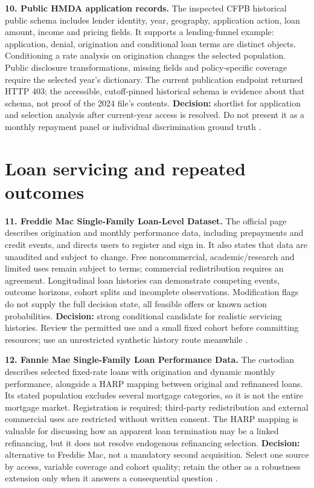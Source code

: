 \textbf{10. Public HMDA application records.} The inspected CFPB
historical public schema includes lender identity, year, geography,
application action, loan amount, income and pricing fields. It supports
a lending-funnel example: application, denial, origination and
conditional loan terms are distinct objects. Conditioning a rate
analysis on origination changes the selected population. Public
disclosure transformations, missing fields and policy-specific coverage
require the selected year's dictionary. The current publication endpoint
returned HTTP 403; the accessible, cutoff-pinned historical schema is
evidence about that schema, not proof of the 2024 file's contents.
\textbf{Decision:} shortlist for application and selection analysis
after current-year access is resolved. Do not present it as a monthly
repayment panel or individual discrimination ground truth
\citep{pd15_hmda_schema}.

\hypertarget{loan-servicing-and-repeated-outcomes}{%
\section{Loan servicing and repeated
outcomes}\label{loan-servicing-and-repeated-outcomes}}

\textbf{11. Freddie Mac Single-Family Loan-Level Dataset.} The official
page describes origination and monthly performance data, including
prepayments and credit events, and directs users to register and sign
in. It also states that data are unaudited and subject to change. Free
noncommercial, academic/research and limited uses remain subject to
terms; commercial redistribution requires an agreement. Longitudinal
loan histories can demonstrate competing events, outcome horizons,
cohort splits and incomplete observations. Modification flags do not
supply the full decision state, all feasible offers or known action
probabilities. \textbf{Decision:} strong conditional candidate for
realistic servicing histories. Review the permitted use and a small
fixed cohort before committing resources; use an unrestricted synthetic
history route meanwhile \citep{pd15_freddie}.

\textbf{12. Fannie Mae Single-Family Loan Performance Data.} The
custodian describes selected fixed-rate loans with origination and
dynamic monthly performance, alongside a HARP mapping between original
and refinanced loans. Its stated population excludes several mortgage
categories, so it is not the entire mortgage market. Registration is
required; third-party redistribution and external commercial uses are
restricted without written consent. The HARP mapping is valuable for
discussing how an apparent loan termination may be a linked refinancing,
but it does not resolve endogenous refinancing selection.
\textbf{Decision:} alternative to Freddie Mac, not a mandatory second
acquisition. Select one source by access, variable coverage and cohort
quality; retain the other as a robustness extension only when it answers
a consequential question \citep{pd15_fannie}.

